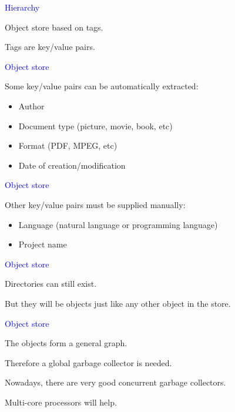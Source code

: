 \documentclass{slides}
\newcommand{\ti}[1]{\begin{center}\Large{\textcolor{blue}{#1}}\end{center}}
\begin{document}
\begin{slide}\ti{Hierarchy}

Object store based on tags.

Tags are key/value pairs.

\vfill\end{slide}
\begin{slide}\ti{Object store}

Some key/value pairs can be automatically extracted:

\begin{itemize}
\item Author
\item Document type (picture, movie, book, etc)
\item Format (PDF, MPEG, etc)
\item Date of creation/modification
\end{itemize}

\vfill\end{slide}
\begin{slide}\ti{Object store}

Other key/value pairs must be supplied manually:

\begin{itemize}
\item Language (natural language or programming language)
\item Project name
\end{itemize}

\vfill\end{slide}
\begin{slide}\ti{Object store}

Directories can still exist.

But they will be objects just like any other object in the store.

\vfill\end{slide}
\begin{slide}\ti{Object store}

The objects form a general graph.

Therefore a global garbage collector is needed.

Nowadays, there are very good concurrent garbage collectors.

Multi-core processors will help.

\vfill\end{slide}
\end{document}

